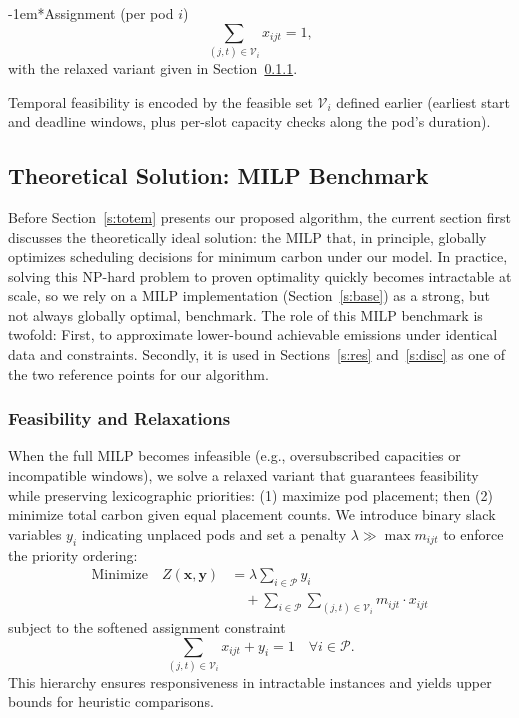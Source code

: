\documentclass[10pt,journal,compsoc]{IEEEtran}
\makeatletter
\renewcommand{\paragraph}{\@startsection{paragraph}{4}{0pt}{1.5ex plus 1.5ex minus 0.5ex}%
{-1em}{\normalfont\normalsize\bfseries}}
\makeatother
\begin{document}
\paragraph*{Assignment (per pod $i$)}
\begin{equation}
\sum_{(j,t) \in \mathcal{V}_i} x_{ijt} = 1,
\end{equation}
with the relaxed variant given in Section~\ref{s:relax}.

\vspace{2pt}

Temporal feasibility is encoded by the feasible set $\mathcal{V}_i$ defined earlier (earliest start and deadline windows, plus per-slot capacity checks along the pod's duration).

\subsection{Theoretical Solution: MILP Benchmark}\label{s:milp}

Before Section~\ref{s:totem} presents our proposed algorithm, the current section first discusses the theoretically ideal solution: the MILP that, in principle, globally optimizes scheduling decisions for minimum carbon under our model. In practice, solving this NP-hard problem to proven optimality quickly becomes intractable at scale, so we rely on a MILP implementation (Section~\ref{s:base}) as a strong, but not always globally optimal, benchmark. The role of this MILP benchmark is twofold: First, to approximate lower-bound achievable emissions under identical data and constraints. Secondly, it is used in Sections~\ref{s:res} and~\ref{s:disc} as one of the two reference points for our algorithm.

\subsubsection{Feasibility and Relaxations}\label{s:relax}

When the full MILP becomes infeasible (e.g., oversubscribed capacities or incompatible windows), we solve a relaxed variant that guarantees feasibility while preserving lexicographic priorities: (1) maximize pod placement; then (2) minimize total carbon given equal placement counts. We introduce binary slack variables $y_i$ indicating unplaced pods and set a penalty $\lambda \gg \max m_{ijt}$ to enforce the priority ordering:
\begin{align}
\text{Minimize} \quad Z(\mathbf{x}, \mathbf{y}) &= \lambda \sum_{i \in \mathcal{P}} y_i \\
&\quad + \sum_{i \in \mathcal{P}} \sum_{(j,t) \in \mathcal{V}_i} m_{ijt} \cdot x_{ijt}
\end{align}
subject to the softened assignment constraint
\begin{equation}
\sum_{(j,t) \in \mathcal{V}_i} x_{ijt} + y_i = 1 \quad \forall i \in \mathcal{P}.
\end{equation}
This hierarchy ensures responsiveness in intractable instances and yields upper bounds for heuristic comparisons.
\end{document}
